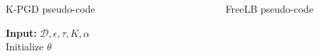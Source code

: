 \documentclass[final]{beamer}
\newlength{\sepwid}
\newlength{\onecolwid}
\newlength{\twocolwid}
\begin{document}
\begin{frame}
\begin{columns}[t]
\begin{column}{\twocolwid}
\begin{columns}[t,totalwidth=\twocolwid]
\begin{column}{\onecolwid}
\begin{exampleblock}{K-PGD pseudo-code}
\begin{algorithm}[H]
\SetAlgoLined
\textbf{Input:} $\mathcal{D},\epsilon,\tau,K,\alpha$\\
Initialize $\theta$\\
\end{algorithm}
\end{exampleblock}

\end{column} %
\begin{column}{\sepwid}\end{column} %

\begin{column}{\onecolwid}\vspace{-.74in} %





\begin{exampleblock}{FreeLB pseudo-code}
\vspace{.65em}
\begin{algorithm}[H]


\end{algorithm}
\end{exampleblock}
\end{column}
\end{columns}
\end{column}
\end{columns}
\end{frame}
\end{document}
